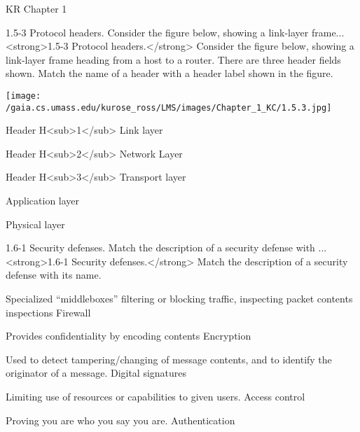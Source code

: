 \documentclass[a4paper]{article}
\begin{document}
\begin{quiz}{KR Chapter 1}
\begin{matching}[
	points=1,
	penalty=0.33333,
]{1.5-3 Protocol headers. Consider the figure below, showing a link-layer frame...}
<strong>1.5-3 Protocol headers.</strong> Consider the figure below, showing a link-layer frame heading from a host to a router.  There are three header fields shown.  Match the name of a header with a header label shown in the figure. 
\begin{center}
\texttt{[image: /gaia.cs.umass.edu/kurose\_ross/LMS/images/Chapter\_1\_KC/1.5.3.jpg]}
\end{center}

\item Header H<sub>1</sub> \answer Link layer
\item Header H<sub>2</sub> \answer Network Layer
\item Header H<sub>3</sub> \answer Transport layer
\item \answer Application layer
\item \answer Physical layer
\end{matching}

\begin{matching}[
	points=1,
	penalty=0.33333,
]{1.6-1 Security defenses.  Match the description of a security defense with ...}
<strong>1.6-1 Security defenses.</strong>  Match the description of a security defense with its name.
\item Specialized “middleboxes” filtering or blocking traffic, inspecting packet contents inspections \answer Firewall
\item Provides confidentiality by encoding contents \answer Encryption
\item Used to detect tampering/changing of message contents, and to identify the originator of a message. \answer Digital signatures
\item Limiting use of resources or capabilities to given users. \answer Access control
\item Proving you are who you say you are. \answer Authentication
\end{matching}


\end{quiz}
\end{document}
